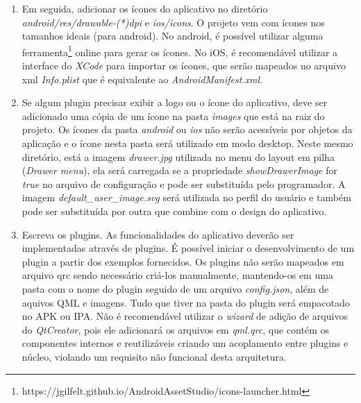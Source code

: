 \begin{enumerate}
	\item Em seguida, adicionar os ícones do aplicativo no diretório \textit{android/res/drawable-(*)dpi} e \textit{ios/icons}. O projeto vem com ícones nos tamanhos ideais (para android). No android, é possível utilizar alguma ferramenta\footnote{https://jgilfelt.github.io/AndroidAssetStudio/icons-launcher.html} online para gerar os ícones. No iOS, é recomendável utilizar a interface do \textit{XCode} para importar os ícones, que serão mapeados no arquivo xml \textit{Info.plist} que é equivalente ao \textit{AndroidManifest.xml}.

	\item Se algum plugin precisar exibir a logo ou o ícone do aplicativo, deve ser adicionado uma cópia de um ícone na pasta \textit{images} que está na raiz do projeto. Os ícones da pasta \textit{android} ou \textit{ios} não serão acessíveis por objetos da aplicação e o ícone nesta pasta será utilizado em modo desktop. Neste mesmo diretório, está a imagem \textit{drawer.jpg} utilizada no menu do layout em pilha (\textit{Drawer menu}), ela será carregada se a propriedade \textit{showDrawerImage} for \textit{true} no arquivo de configuração e pode ser substituída pelo programador. A imagem \textit{default\_user\_image.svg} será utilizada no perfil do usuário e também pode ser substituída por outra que combine com o design do aplicativo.

	\item Escreva os plugins. As funcionalidades do aplicativo deverão ser implementadas através de plugins. É possível iniciar o desenvolvimento de um plugin a partir dos exemplos fornecidos. Os plugins não serão mapeados em arquivo qrc sendo necessário criá-los manualmente, mantendo-os em uma pasta com o nome do plugin seguido de um arquivo \textit{config.json}, além de aquivos QML e imagens. Tudo que tiver na pasta do plugin será empacotado no APK ou IPA. Não é recomendável utilizar o \textit{wizard} de adição de arquivos do \textit{QtCreator}, pois ele adicionará os arquivos em \textit{qml.qrc}, que contém os componentes internos e reutilizáveis criando um acoplamento entre plugins e núcleo, violando um requisito não funcional desta arquitetura.
\end{enumerate}